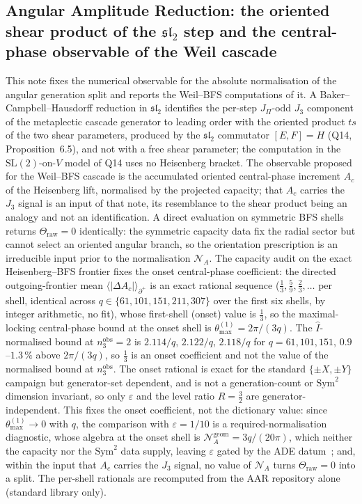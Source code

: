 \documentclass[11pt,a4paper]{article}
\theoremstyle{definition}
\newcommand{\SL}{\mathrm{SL}}
\begin{document}
    \subsection{Angular Amplitude Reduction: the oriented shear product of the \texorpdfstring{$\mathfrak{sl}_2$}{sl2} step and the
    central-phase observable of the Weil cascade~\cite{Beau2026aar}}
      This note fixes the numerical observable for the absolute normalisation of the angular generation
      split and reports the Weil--BFS computations of it.
      A Baker--Campbell--Hausdorff reduction in $\mathfrak{sl}_2$ identifies the per-step $J_\Pi$-odd $J_3$ component of
      the metaplectic cascade generator to leading order with the oriented product $ts$ of the two shear parameters, produced by the
      $\mathfrak{sl}_2$ commutator $[E,F]=H$ (Q14, Proposition~6.5), and not with a free shear parameter; the
      computation in the $\SL(2)$-on-$V$ model of Q14 uses no Heisenberg bracket.
      The observable proposed for the Weil--BFS cascade is the accumulated oriented central-phase increment $A_c$ of the
      Heisenberg lift, normalised by the projected capacity; that $A_c$ carries the $J_3$ signal is an input of that
      note, its resemblance to the shear product being an analogy and not an identification.
      A direct evaluation on symmetric BFS shells returns $\Theta_{\mathrm{raw}}=0$ identically: the
      symmetric capacity data fix the radial sector but cannot select an oriented angular branch, so the
      orientation prescription is an irreducible input prior to the normalisation $\mathcal N_A$.
      The capacity audit on the exact Heisenberg--BFS frontier fixes the onset central-phase coefficient: the directed
      outgoing-frontier mean $\langle|\Delta A_c|\rangle_{\partial^+}$ is an exact rational sequence
      ($\tfrac13,\tfrac59,\tfrac23,\dots$ per shell, identical across $q\in\{61,101,151,211,307\}$ over the first six shells, by integer
      arithmetic, no fit), whose first-shell (onset) value is $\tfrac13$, so the maximal-locking central-phase bound at
      the onset shell is $\theta_{\max}^{(1)}=2\pi/(3q)$.
      The $\widehat I$-normalised bound at $n_3^{\mathrm{obs}}=2$ is $2.114/q$, $2.122/q$, $2.118/q$ for $q=61,101,151$,
      $0.9$--$1.3\,\%$ above $2\pi/(3q)$, so $\tfrac13$ is an onset coefficient and not the value of the normalised
      bound at $n_3^{\mathrm{obs}}$.
      The onset rational is exact for the standard $\{\pm X,\pm Y\}$ campaign but generator-set dependent, and is not a
      generation-count or $\mathrm{Sym}^2$ dimension invariant, so only $\varepsilon$ and the
      level ratio $R=\tfrac32$ are generator-independent.
      This fixes the onset coefficient, not the dictionary value: since $\theta_{\max}^{(1)}\to0$ with $q$, the
      comparison with $\varepsilon=1/10$ is a required-normalisation diagnostic, whose algebra at the onset shell is
      $\mathcal N_A^{\mathrm{geom}}=3q/(20\pi)$, which neither the capacity nor the $\mathrm{Sym}^2$ data supply,
      leaving $\varepsilon$ gated by the ADE datum~\cite{Beau2026aog}; and, within the input that $A_c$ carries the
      $J_3$ signal, no value of $\mathcal N_A$ turns $\Theta_{\mathrm{raw}}=0$ into a split.
      The per-shell rationals are recomputed from the AAR repository alone (standard library only).
\end{document}
